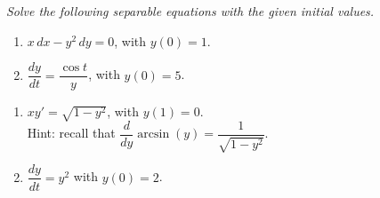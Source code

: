 \documentclass[10pt]{article}
\begin{document}
\noindent
\textit{Solve the following separable equations with the given initial values.}

\begin{multicols}{2}
\begin{enumerate}
\setcounter{enumi}{\theenumCount}
\item $x \, dx - y^2 \, dy = 0$, with $y(0) = 1$. 


\item $\dfrac{dy}{dt} = \dfrac{\cos t}{y}$, with $y(0) = 5$.

\setcounter{enumCount}{\theenumi}
\end{enumerate} 
\end{multicols}

\vfill
\vfill

\begin{multicols}{2}
\begin{enumerate}
\setcounter{enumi}{\theenumCount}
\item $xy' = \sqrt{1-y^2}$, with $y(1) = 0$. \\ \vfill
Hint: recall that $\dfrac{d}{dy} \arcsin(y) = \dfrac{1}{\sqrt{1 - y^2}}$. 



\item $\dfrac{dy}{dt} = y^2$ with $y(0) = 2$.  

\setcounter{enumCount}{\theenumi}
\end{enumerate} 
\end{multicols}


\vfill
\vfill
\vfill
\end{document}
